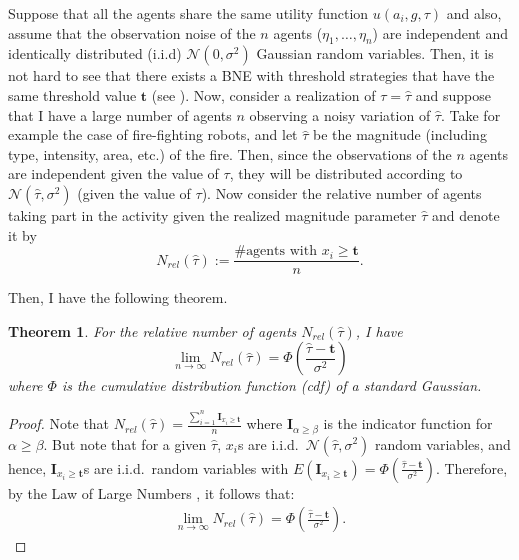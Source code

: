 \documentclass[defaultstyle,12pt]{proposal}
\newtheorem{theorem}{Theorem}
\newcommand{\td}{\mathbf{t}}
\begin{document}
Suppose that all the agents share the same utility function $u(a_i,g,\tau)$ and also, assume that the observation noise of the $n$ agents ($\eta_1,\ldots,\eta_n$) are independent and identically distributed (i.i.d) $\mathcal{N}(0,\sigma^2)$ Gaussian random variables. Then, it is not hard to see that there exists a BNE with threshold strategies that have the same threshold value $\td$ (see  \cite{Morris2000}). Now, consider a realization of $\tau=\hat{\tau}$ and suppose that I have a large number of agents $n$ observing a noisy variation of $\hat{\tau}$. Take for example the case of fire-fighting robots, and let $\hat{\tau}$ be the magnitude (including type, intensity, area, etc.) of the fire. Then, since the observations of the $n$ agents are independent given the value of $\tau$, they will be distributed according to $\mathcal{N}(\hat{\tau},\sigma^2)$ (given the value of $\tau$). Now consider the relative number of agents taking part in the activity given the realized magnitude parameter $\hat{\tau}$ and denote it by 
\begin{equation}\label{eqn:Nrel}
	N_{rel}(\hat{\tau}):=\frac{\#\text{agents with }x_i\geq \td}{n}.
\end{equation}

Then, I have the following theorem.
\begin{theorem}\label{thrm:relativefrequency}
For the relative number of agents $N_{rel}(\hat{\tau})$, I have
\begin{equation}
\lim_{n\to\infty}N_{rel}(\hat{\tau})=\Phi(\frac{\hat{\tau}-\td}{\sigma^2})
\end{equation}
where $\Phi$ is the cumulative distribution function (cdf) of a standard Gaussian. 
\end{theorem}
\begin{proof}
Note that $N_{rel}(\hat{\tau})=\frac{\sum_{i=1}^n\mathbf{I}_{x_i\geq \td}}{n}$ where $\mathbf{I}_{\alpha\geq \beta}$ is the indicator function for $\alpha\geq \beta$. But note that for a given $\hat{\tau}$, $x_i$s are i.i.d.\ $\mathcal{N}(\hat{\tau},\sigma^2)$ random variables, and hence, $\mathbf{I}_{x_i\geq \td}$s are i.i.d.\ random variables with $E(\mathbf{I}_{x_i\geq \td})=\Phi(\frac{\hat{\tau}-\td}{\sigma^2})$. Therefore, by the Law of Large Numbers \cite{durrett2010}, it follows that:
\vspace{-5px}
\begin{align*}
\lim_{n\to\infty}N_{rel}(\hat{\tau})=\Phi(\frac{\hat{\tau}-\td}{\sigma^2}).
\end{align*}
\vspace{-5px}
\end{proof}
\end{document}
